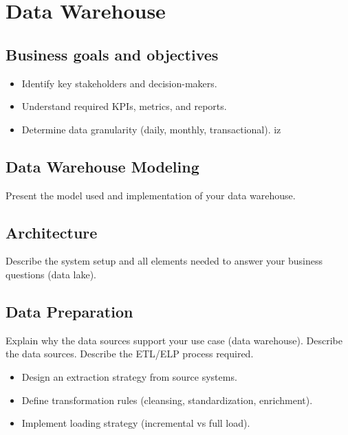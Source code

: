 \cleardoublepage%
\chapter{\label{chap:dw}Data Warehouse}%

\section{\label{sec:dw_b}Business goals and objectives}

\begin{itemize}
\item Identify key stakeholders and decision-makers.
\item Understand required KPIs, metrics, and reports.
\item Determine data granularity (daily, monthly, transactional).
iz
\end{itemize}

\section{\label{sec:dw_modeling}Data Warehouse Modeling}

Present the model used and implementation of your data warehouse. 



\section{\label{sec:dw_architecture}Architecture}

Describe the system setup and all elements needed to answer your business questions (data lake).

\section{\label{sec:dw_preparation}Data Preparation}

Explain why the data sources support your use case (data warehouse). Describe the data sources. Describe the ETL/ELP process required.  


\begin{itemize}
\item Design an extraction strategy from source systems.
\item Define transformation rules (cleansing, standardization, enrichment).
\item Implement loading strategy (incremental vs full load).
\end{itemize}
 